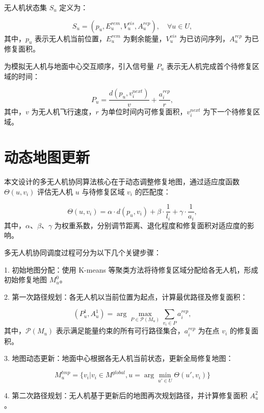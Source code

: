 \documentclass[AutoFakeBold]{LZUThesis}
\begin{document}
无人机状态集 $S_u$ 定义为：

\begin{equation}
	S_u = (p_u, E_u^{rem}, V_u^{vis}, A_u^{rep}), \quad \forall u \in U,
\end{equation}
其中，$p_u$ 表示无人机当前位置，$E_u^{rem}$ 为剩余能量，$V_u^{vis}$ 为已访问序列，$A_u^{rep}$ 为已修复面积。

为模拟无人机与地面中心交互顺序，引入信号量 $P_u$ 表示无人机完成首个待修复区域的时间：

\begin{equation}
	P_u = \frac{d(p_u, v_i^{next})}{v} + \frac{a_i^{rep}}{r},
\end{equation}
其中，$v$ 为无人机飞行速度，$r$ 为单位时间内可修复面积，$v_i^{next}$ 为下一个待修复区域。

\section{动态地图更新}

本文设计的多无人机协同算法核心在于动态调整修复地图，通过适应度函数 $\Theta(u,v_i)$ 评估无人机 $u$ 与待修复区域 $v_i$ 的匹配度：

\begin{equation}
	\Theta(u,v_i) = \alpha \cdot d(p_u, v_i) + \beta \cdot \frac{1}{l_i} + \gamma \cdot \frac{1}{a_i},
\end{equation}
其中，$\alpha$、$\beta$、$\gamma$ 为权重系数，分别调节距离、退化程度和修复面积对适应度的影响。

多无人机协同调度过程可分为以下几个关键步骤：

1. 初始地图分配：使用 K-means 等聚类方法将待修复区域分配给各无人机，形成初始修复地图 $M_u^0$。

2. 第一次路径规划：各无人机以当前位置为起点，计算最优路径及修复面积：

\begin{equation}
	(P_u^1, A_u^1) = \arg\max_{P \in \mathcal{P}(M_u)} \sum_{v_i \in P} a_i^{rep},
\end{equation}
其中，$\mathcal{P}(M_u)$ 表示满足能量约束的所有可行路径集合，$a_i^{rep}$ 为在点 $v_i$ 的修复面积。

3. 地图动态更新：地面中心根据各无人机当前状态，更新全局修复地图：

\begin{equation}
	M_u^{tmp} = \{v_i | v_i \in M^{global}, u = \arg\min_{u' \in U} \Theta(u',v_i)\}
\end{equation}

4. 第二次路径规划：无人机基于更新后的地图再次规划路径，并计算修复面积 $A_u^2$。
\end{document}
